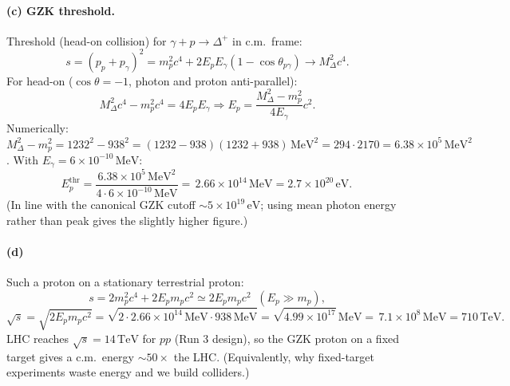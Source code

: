 \documentclass[11pt]{article}
\newcommand{\MeV}{\,\mathrm{MeV}}
\begin{document}
\paragraph{(c) GZK threshold.} Threshold (head-on collision) for $\gamma+p\to\Delta^+$ in c.m.\ frame:
\[
s=(p_p+p_\gamma)^{2}=m_p^{2}c^{4}+2 E_p E_\gamma(1-\cos\theta_{p\gamma})\to M_\Delta^{2}c^{4}.
\]
For head-on ($\cos\theta=-1$, photon and proton anti-parallel):
\[
M_\Delta^{2}c^{4}-m_p^{2}c^{4}=4 E_p E_\gamma\Rightarrow E_p=\frac{M_\Delta^{2}-m_p^{2}}{4 E_\gamma}c^{2}.
\]
Numerically: $M_\Delta^{2}-m_p^{2}=1232^{2}-938^{2}=(1232-938)(1232+938)\MeV^{2}=294\cdot 2170=6.38\times 10^{5}\MeV^{2}$. With $E_\gamma=6\times 10^{-10}\MeV$:
\[
E_p^\mathrm{thr}=\frac{6.38\times 10^{5}\MeV^{2}}{4\cdot 6\times 10^{-10}\MeV}=\boxed{\,2.66\times 10^{14}\MeV=2.7\times 10^{20}\,\mathrm{eV}.\,}
\]
(In line with the canonical GZK cutoff $\sim 5\times 10^{19}\,\mathrm{eV}$; using mean photon energy rather than peak gives the slightly higher figure.)

\paragraph{(d)} Such a proton on a stationary terrestrial proton:
\[
s = 2 m_p^{2} c^{4}+2 E_p m_p c^{2}\simeq 2 E_p m_p c^{2}\;\;(E_p\gg m_p),
\]
\[
\sqrt{s}=\sqrt{2 E_p m_p c^{2}}=\sqrt{2\cdot 2.66\times 10^{14}\MeV\cdot 938\MeV}=\sqrt{4.99\times 10^{17}}\MeV
=\boxed{\,7.1\times 10^{8}\MeV=710\,\mathrm{TeV}.\,}
\]
LHC reaches $\sqrt{s}=14\,\mathrm{TeV}$ for $pp$ (Run 3 design), so the GZK proton on a fixed target gives a c.m.\ energy $\sim 50\times$ the LHC. (Equivalently, why fixed-target experiments waste energy and we build colliders.)
\end{document}
